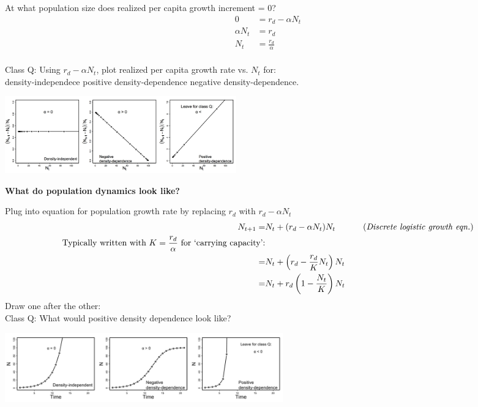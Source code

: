 \documentclass{article}
\newcommand{\note}[1]{\colorbox{gray!30}{#1}}
\newcommand{\ind}{\-\hspace{1cm}}
\begin{document}
At what population size does realized per capita growth increment = 0?
\begin{align*}
	0&=r_d-\alpha N_t\\
	\alpha N_t &= r_d\\
	N_t&=\frac{r_d}{\alpha}\\
\end{align*}

\pagebreak

\note{Class Q:} Using $r_d-\alpha N_t$, plot realized per capita growth rate vs. $N_t$ for: \\
\ind density-independece
\ind positive density-dependence
\ind negative density-dependence.
\begin{center}
\includegraphics[width=10cm]{figs/densdep_percap.jpg}
\end{center}

\textbf{What do population dynamics look like?}

Plug into equation for population growth rate by replacing $r_d$ with $r_d-\alpha N_t$
\begin{align*}
	N_{t+1}=& N_t+(r_d-\alpha N_t)N_t &\;\;\;\;\text{(\emph{Discrete logistic growth eqn.})}\\
\text{Typically written with $K=\frac{r_d}{\alpha}$ for `carrying capacity':}&\\
	=  & N_t + \left(r_d-\frac{r_d}{K} N_t \right) N_t &\\
	=  & N_t + r_d\left(1-\frac{N_t}{K}\right) N_t &
\end{align*}
\note{Draw  one after the other:}\\
\note{Class Q:} What would positive density dependence look like?
\begin{center}
\includegraphics[width=12cm]{figs/densdep_popsize.jpg}
\end{center}
\end{document}
